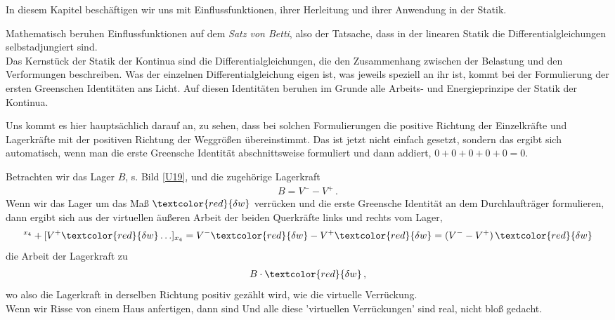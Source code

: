 {In diesem Kapitel besch\"{a}ftigen wir uns mit Einflussfunktionen, ihrer Herleitung und ihrer Anwendung in der Statik.

Mathematisch beruhen Einflussfunktionen auf dem {\em Satz von Betti\/}, also der Tatsache, dass in der linearen Statik die Differentialgleichungen selbstadjungiert sind.
\\

Das Kernst\"{u}ck der Statik der Kontinua sind die Differentialgleichungen, die den Zusammenhang zwischen der Belastung und den Verformungen beschreiben. Was der einzelnen Differentialgleichung eigen ist, was jeweils speziell an ihr ist, kommt bei der Formulierung der ersten Greenschen Identit\"{a}ten ans Licht. Auf diesen Identit\"{a}ten beruhen im Grunde alle Arbeits- und Energieprinzipe der Statik der Kontinua.



Uns kommt es hier haupts\"{a}chlich darauf an, zu sehen, dass bei solchen Formulierungen die positive Richtung der Einzelkr\"{a}fte und Lagerkr\"{a}fte mit der positiven Richtung der Weggr\"{o}{\ss}en \"{u}bereinstimmt. Das ist jetzt nicht einfach gesetzt, sondern das ergibt sich automatisch, wenn man die erste Greensche Identit\"{a}t abschnittsweise formuliert und dann addiert, $0 + 0 + 0 + 0 + 0 = 0$.

Betrachten wir das Lager $B$, s. Bild \ref{U19}, und die zugeh\"{o}rige Lagerkraft
\begin{align}
B  = V^- - V^+\,.
\end{align}
Wenn wir das Lager  um das Ma{\ss} $\textcolor{red}{\delta w} $ verr\"{u}cken und die erste Greensche Identit\"{a}t an dem Durchlauftr\"{a}ger formulieren, dann ergibt sich aus der virtuellen \"{a}u{\ss}eren Arbeit der beiden Querkr\"{a}fte links und rechts vom Lager,
\begin{align}
[... V^-\textcolor{red}{\delta w} ]^{x_4} + [V^+\textcolor{red}{\delta w}  \ldots]_{x_4} =  V^- \textcolor{red}{\delta w} - V^+ \textcolor{red}{\delta w} = ( V^- - V^+) \,\textcolor{red}{\delta w}
\end{align}
die Arbeit der Lagerkraft zu
\begin{align}
B \cdot \textcolor{red}{\delta w}\,,
\end{align}
wo also die Lagerkraft in derselben Richtung positiv gez\"{a}hlt wird, wie die virtuelle Verr\"{u}ckung.\\

Wenn wir Risse von einem Haus anfertigen, dann sind
Und alle diese 'virtuellen Verr\"{u}ckungen' sind real, nicht blo{\ss} gedacht.

}
